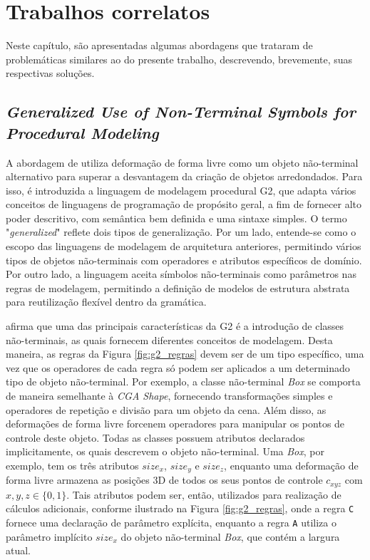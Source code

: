 \chapter{Trabalhos correlatos}
\label{cap:trabalhos-correlatos}

Neste capítulo, são apresentadas algumas abordagens que trataram de problemáticas similares ao do presente trabalho, descrevendo, brevemente, suas respectivas soluções.

\section{\textit{Generalized Use of Non-Terminal Symbols for Procedural Modeling}} %
\label{sec:paper_krekclau2010}

A abordagem de  utiliza deformação de forma livre como um objeto não-terminal alternativo para superar a desvantagem da criação de objetos arredondados. Para isso, é introduzida a linguagem de modelagem procedural \gls{G2}, que adapta vários conceitos de linguagens de programação de propósito geral, a fim de fornecer alto poder descritivo, com semântica bem definida e uma sintaxe simples. O termo "\textit{generalized}" \; reflete dois tipos de generalização. Por um lado, entende-se como o escopo das linguagens de modelagem de arquitetura anteriores, permitindo vários tipos de objetos não-terminais com operadores e atributos específicos de domínio. Por outro lado, a linguagem aceita símbolos não-terminais como parâmetros nas regras de modelagem, permitindo a definição de modelos de estrutura abstrata para reutilização flexível dentro da gramática. 

 afirma que uma das principais características da \gls{G2} é a introdução de classes não-terminais, as quais fornecem diferentes conceitos de modelagem. Desta maneira, as regras da Figura \ref{fig:g2_regras} devem ser de um tipo específico, uma vez que os operadores de cada regra só podem ser aplicados a um determinado tipo de objeto não-terminal. Por exemplo, a classe não-terminal \textit{Box} se comporta de maneira semelhante à \textit{CGA Shape}, fornecendo transformações simples e operadores de repetição e divisão para um objeto da cena. Além disso, as deformações de forma livre forcenem operadores para manipular os pontos de controle deste objeto. Todas as classes possuem atributos declarados implicitamente, os quais descrevem o objeto não-terminal. Uma \textit{Box}, por exemplo, tem os três atributos $size_x$, $size_y$ e $size_z$, enquanto uma deformação de forma livre armazena as posições 3D de todos os seus pontos de controle $c_{xyz}$ com $x, y, z \in \{0, 1\}$. Tais atributos podem ser, então, utilizados para realização de cálculos adicionais, conforme ilustrado na Figura \ref{fig:g2_regras}, onde a regra \texttt{C} fornece uma declaração de parâmetro explícita, enquanto a regra \texttt{A} utiliza o parâmetro implícito $size_x$ do objeto não-terminal \textit{Box}, que contém a largura atual.

